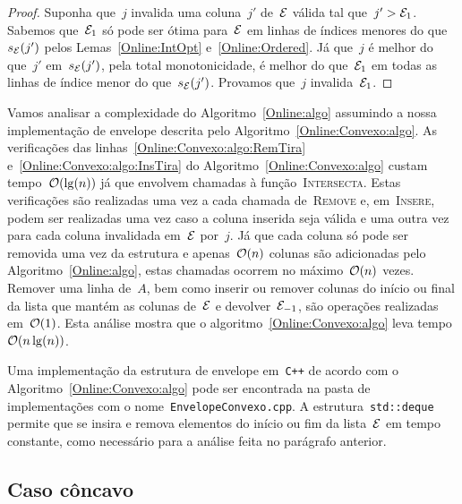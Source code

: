 \begin{proof}
Suponha que~$j$ invalida uma coluna~$j'$ de~$\mathcal{E}$ válida tal que~$j' > \mathcal{E}_1$. Sabemos que~$\mathcal{E}_1$ só pode ser ótima para~$\mathcal{E}$ em linhas de índices menores do que~$s_{\mathcal{E}}(j')$ pelos Lemas~\ref{Online:IntOpt} e~\ref{Online:Ordered}. Já que~$j$ é melhor do que~$j'$ em~$s_{\mathcal{E}}(j')$, pela total monotonicidade, é melhor do que~$\mathcal{E}_1$ em todas as linhas de índice menor do que~$s_{\mathcal{E}}(j')$. Provamos que~$j$ invalida~$\mathcal{E}_1$.
\end{proof}

Vamos analisar a complexidade do Algoritmo~\ref{Online:algo} assumindo a nossa implementação de envelope descrita pelo Algoritmo~\ref{Online:Convexo:algo}. As verificações das linhas~\ref{Online:Convexo:algo:RemTira} e~\ref{Online:Convexo:algo:InsTira} do Algoritmo~\ref{Online:Convexo:algo} custam tempo~$\mathcal{O}(\lg(n))$ já que envolvem chamadas à função~\textsc{Intersecta}. Estas verificações são realizadas uma vez a cada chamada de~\textsc{Remove} e, em~\textsc{Insere}, podem ser realizadas uma vez caso a coluna inserida seja válida e uma outra vez para cada coluna invalidada em~$\mathcal{E}$ por~$j$. Já que cada coluna só pode ser removida uma vez da estrutura e apenas~$\mathcal{O}(n)$ colunas são adicionadas pelo Algoritmo~\ref{Online:algo}, estas chamadas ocorrem no máximo~$\mathcal{O}(n)$ vezes. Remover uma linha de~$A$, bem como inserir ou remover colunas do início ou final da lista que mantém as colunas de~$\mathcal{E}$ e devolver~$\mathcal{E}_{-1}$, são operações realizadas em~$\mathcal{O}(1)$. Esta análise mostra que o algoritmo~\ref{Online:Convexo:algo} leva tempo~$\mathcal{O}(n\lg(n))$.

Uma implementação da estrutura de envelope em~\texttt{C++} de acordo com o Algoritmo~\ref{Online:Convexo:algo} pode ser encontrada na pasta de implementações com o nome~\texttt{EnvelopeConvexo.cpp}. A estrutura~\texttt{std::deque} permite que se insira e remova elementos do início ou fim da lista~$\mathcal{E}$ em tempo constante, como necessário para a análise feita no parágrafo anterior.


\subsection{Caso côncavo} \label{Online:concave}

